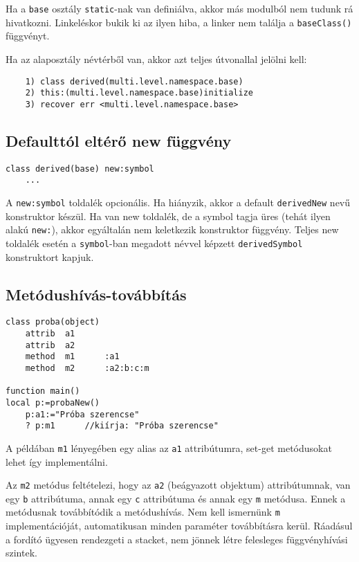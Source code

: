 Ha a \verb!base! osztály \verb!static!-nak van definiálva,
akkor más modulból nem tudunk rá hivatkozni. Linkeléskor 
bukik ki az ilyen hiba, a linker nem találja a \verb!baseClass()! függvényt.

Ha az alaposztály névtérből van, 
akkor azt teljes útvonallal jelölni kell:
\begin{verbatim}
    1) class derived(multi.level.namespace.base)
    2) this:(multi.level.namespace.base)initialize
    3) recover err <multi.level.namespace.base>
\end{verbatim}




\subsection{Defaulttól eltérő new függvény}

\begin{verbatim}
class derived(base) new:symbol
    ...
\end{verbatim}

A \verb!new:symbol! toldalék opcionális. 
Ha hiányzik, akkor a default \verb!derivedNew! 
nevű konstruktor készül.
Ha van new toldalék, de a symbol tagja üres 
(tehát ilyen alakú \verb!new:!), akkor egyáltalán nem keletkezik 
konstruktor függvény. Teljes new toldalék esetén a 
\verb!symbol!-ban megadott névvel képzett \verb!derivedSymbol! 
konstruktort kapjuk.



\subsection{Metódushívás-továbbítás}

\begin{verbatim}
class proba(object)
    attrib  a1
    attrib  a2
    method  m1      :a1
    method  m2      :a2:b:c:m

function main()
local p:=probaNew()
    p:a1:="Próba szerencse"
    ? p:m1      //kiírja: "Próba szerencse"
\end{verbatim}

A példában \verb!m1! lényegében egy alias az \verb!a1! attribútumra,
set-get metódusokat lehet így implementálni.

Az \verb!m2! metódus feltételezi, hogy az \verb!a2! (beágyazott objektum) 
attribútumnak, van egy \verb!b! attribútuma, annak egy \verb!c! attribútuma 
és annak egy \verb!m! metódusa. Ennek a metódusnak továbbítódik a metódushívás.
Nem kell ismernünk \verb!m! implementációját, automatikusan
minden paraméter továbbításra kerül. Ráadásul a fordító ügyesen
rendezgeti a stacket, nem jönnek létre felesleges függvényhívási szintek.




